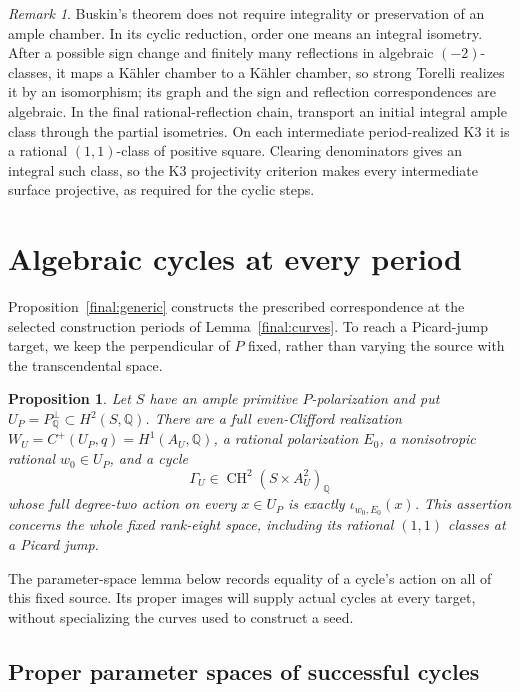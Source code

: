 \documentclass[11pt]{amsart}
\newcommand{\Q}{\mathbb Q}
\DeclareMathOperator{\CH}{CH}
\newtheorem{proposition}[theorem]{Proposition}
\theoremstyle{definition}
\theoremstyle{remark}
\newtheorem{remark}[theorem]{Remark}
\numberwithin{equation}{section}
\begin{document}
\begin{remark}
Buskin's theorem does not require integrality or preservation of an
ample chamber.  In its cyclic reduction, order one means an integral
isometry.  After a possible sign change and finitely many reflections
in algebraic $(-2)$-classes, it maps a K\"ahler chamber to a K\"ahler
chamber, so strong Torelli realizes it by an isomorphism; its graph
and the sign and reflection correspondences are algebraic.  In the
final rational-reflection chain, transport an initial integral ample
class through the partial isometries.  On each intermediate
period-realized K3 it is a rational $(1,1)$-class of positive square.
Clearing denominators gives an integral such class, so the K3
projectivity criterion makes every intermediate surface projective,
as required for the cyclic steps.
\end{remark}
\section{Algebraic cycles at every period}
\label{specialization:section}

Proposition~\ref{final:generic} constructs the prescribed correspondence
at the selected construction periods of Lemma~\ref{final:curves}.
To reach a Picard-jump target, we keep the perpendicular of $P$ fixed,
rather than varying the source with the transcendental space.

\begin{proposition}\label{specialization:ambient}
Let $S$ have an ample primitive $P$-polarization and put
$U_P=P_{\Q}^{\perp}\subset H^2(S,\Q)$.  There are a full even-Clifford
realization $W_U=C^+(U_P,q)=H^1(A_U,\Q)$, a rational polarization
$E_0$, a nonisotropic rational $w_0\in U_P$, and a cycle
\[
 \Gamma_U\in\CH^2(S\times A_U^2)_{\Q}
\]
whose full degree-two action on every $x\in U_P$ is exactly
$\iota_{w_0,E_0}(x)$.  This assertion concerns the whole fixed
rank-eight space, including its rational $(1,1)$ classes at a Picard
jump.
\end{proposition}

The parameter-space lemma below records equality of a cycle's action
on all of this fixed source.  Its proper images will supply actual
cycles at every target, without specializing the curves used to
construct a seed.

\subsection{Proper parameter spaces of successful cycles}
\end{document}
